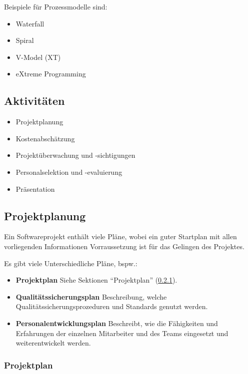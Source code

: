 			Beispiele für Prozessmodelle sind:
			\begin{itemize}
				\item Waterfall
				\item Spiral
				\item V-Model (XT)
				\item eXtreme Programming
			\end{itemize}

		\subsection{Aktivitäten}
			\begin{itemize}
				\item Projektplanung
				\item Kostenabschätzung
				\item Projektüberwachung und -sichtigungen
				\item Personalselektion und -evaluierung
				\item Präsentation
			\end{itemize}

		\subsection{Projektplanung}
			Ein Softwareprojekt enthält viele Pläne, wobei ein guter Startplan mit allen vorliegenden Informationen Vorraussetzung ist für das Gelingen des Projektes.

			Es gibt viele Unterschiedliche Pläne, bspw.:
			\begin{itemize}
				\item \textbf{Projektplan} Siehe Sektionen \enquote{Projektplan} (\ref{ssec:projektplan}).
				\item \textbf{Qualitätssicherungsplan} Beschreibung, welche Qualitätssicherungsprozeduren und Standards genutzt werden.
				\item \textbf{Personalentwicklungsplan} Beschreibt, wie die Fähigkeiten und Erfahrungen der einzelnen Mitarbeiter und des Teams eingesetzt und weiterentwickelt werden.
			\end{itemize}

			\subsubsection{Projektplan}
				\label{ssec:projektplan}

